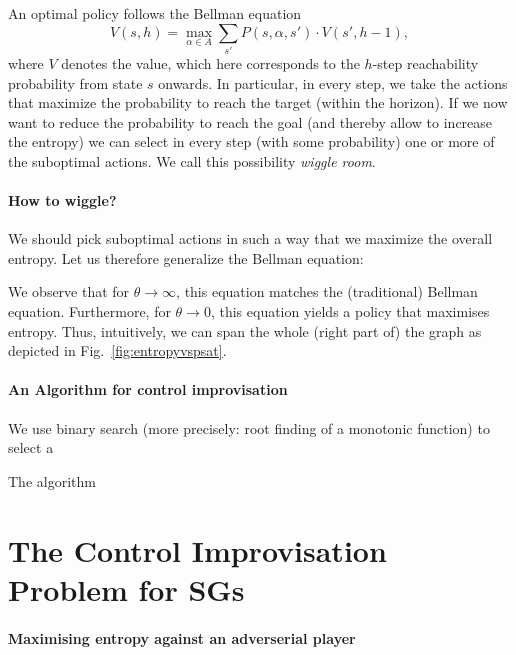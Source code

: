 \documentclass[conference]{IEEEtran}
\theoremstyle{remark}
\newcommand{\act}{\alpha}
\newcommand{\Act}{A}
\begin{document}
An optimal policy follows the Bellman equation
\[ V(s,h)  = \max_{\act \in \Act} \sum_{s'} P(s,\act,s') \cdot V(s',h-1),\]
where $V$ denotes the value, which here corresponds to the $h$-step reachability probability from state $s$ onwards.
In particular, in every step, we take the actions that maximize the probability to reach the target (within the horizon). 
If we now want to reduce the probability to reach the goal (and thereby allow to increase the entropy) we can select in every step (with some probability) one or more of the suboptimal actions. We call this possibility \emph{wiggle room}. 
\paragraph{How to wiggle?}
We should pick suboptimal actions in such a way that we maximize the overall entropy. Let us therefore generalize the Bellman equation:

We observe that for $\theta \rightarrow \infty$, this equation matches the (traditional) Bellman equation. 
Furthermore, for $\theta \rightarrow 0$, this equation yields a policy that maximises entropy.
Thus, intuitively, we can span the whole (right part of) the graph as depicted in Fig.~\ref{fig:entropyvspsat}.


\paragraph{An Algorithm for control improvisation}

We use binary search (more precisely: root finding of a monotonic function) to select a 

The algorithm 




 

\section{The Control Improvisation Problem for SGs}
\paragraph{Maximising entropy against an adverserial player}
\end{document}
